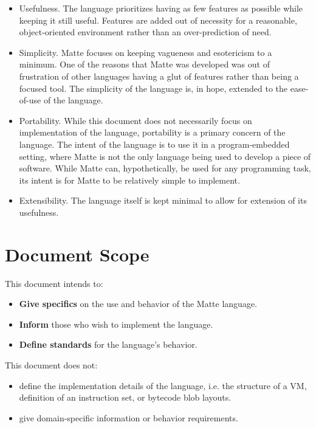 \documentclass[12pt,letterpaper]{report}
\begin{document}
\begin{itemize}
\item Usefulness. The language prioritizes having as few features as possible 
  while keeping it still useful. Features are added out of necessity for a reasonable, 
  object-oriented environment rather than an over-prediction of need.

\item Simplicity. Matte focuses on keeping vagueness and esotericism to a minimum. One 
  of the reasons that Matte was developed was out of frustration of other 
  languages having a glut of features rather than being a focused tool. The 
  simplicity of the language is, in hope, extended to the ease-of-use of the language.

\item Portability. While this document does not necessarily focus on implementation 
  of the language, portability is a primary concern of the language. 
  The intent of the language is to use it in a program-embedded setting, 
  where Matte is not the only language being used to develop a piece of software. 
  While Matte can, hypothetically, be used for any programming task, its intent is 
  for Matte to be relatively simple to implement. 

\item Extensibility. The language itself is kept minimal to allow for extension of its 
  usefulness.
\end{itemize}

\section{Document Scope}

This document intends to:
\begin{itemize}
\item \textbf{Give specifics} on the use and behavior of the Matte language. 
\item \textbf{Inform} those who wish to implement the language.
\item \textbf{Define standards} for the language's behavior.
\end{itemize}
This document does not:
\begin{itemize}
\item define the implementation details of the language, i.e. the 
      structure of a VM, definition of an instruction set, or bytecode blob layouts.
\item give domain-specific information or behavior requirements.
\end{itemize}
\end{document}
